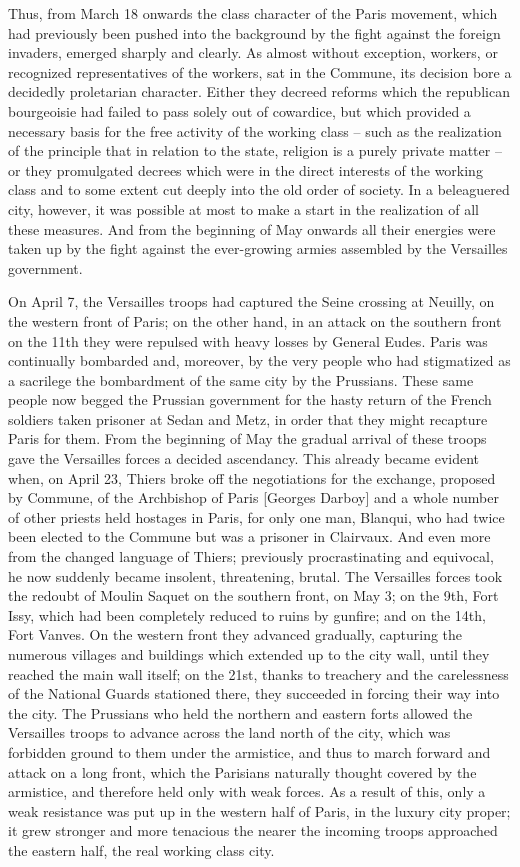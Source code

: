 \documentclass{book}
\begin{document}
Thus, from March 18 onwards the class character of the Paris movement,
which had previously been pushed into the background by the fight against
the foreign invaders, emerged sharply and clearly. As almost without
exception, workers, or recognized representatives of the workers, sat in
the Commune, its decision bore a decidedly proletarian character. Either
they decreed reforms which the republican bourgeoisie had failed to pass
solely out of cowardice, but which provided a necessary basis for the free
activity of the working class – such as the realization of the principle
that in relation to the state, religion is a purely private matter – or
they promulgated decrees which were in the direct interests of the working
class and to some extent cut deeply into the old order of society. In
a beleaguered city, however, it was possible at most to make a start in
the realization of all these measures. And from the beginning of May
onwards all their energies were taken up by the fight against the
ever-growing armies assembled by the Versailles government.

On April 7, the Versailles troops had captured the Seine crossing at
Neuilly, on the western front of Paris; on the other hand, in an attack on
the southern front on the 11th they were repulsed with heavy losses by
General Eudes. Paris was continually bombarded and, moreover, by the very
people who had stigmatized as a sacrilege the bombardment of the same city
by the Prussians. These same people now begged the Prussian government for
the hasty return of the French soldiers taken prisoner at Sedan and Metz,
in order that they might recapture Paris for them. From the beginning of
May the gradual arrival of these troops gave the Versailles forces
a decided ascendancy. This already became evident when, on April 23,
Thiers broke off the negotiations for the exchange, proposed by Commune,
of the Archbishop of Paris [Georges Darboy] and a whole number of other
priests held hostages in Paris, for only one man, Blanqui, who had twice
been elected to the Commune but was a prisoner in Clairvaux. And even more
from the changed language of Thiers; previously procrastinating and
equivocal, he now suddenly became insolent, threatening, brutal. The
Versailles forces took the redoubt of Moulin Saquet on the southern front,
on May 3; on the 9th, Fort Issy, which had been completely reduced to
ruins by gunfire; and on the 14th, Fort Vanves. On the western front they
advanced gradually, capturing the numerous villages and buildings which
extended up to the city wall, until they reached the main wall itself; on
the 21st, thanks to treachery and the carelessness of the National Guards
stationed there, they succeeded in forcing their way into the city. The
Prussians who held the northern and eastern forts allowed the Versailles
troops to advance across the land north of the city, which was forbidden
ground to them under the armistice, and thus to march forward and attack
on a long front, which the Parisians naturally thought covered by the
armistice, and therefore held only with weak forces. As a result of this,
only a weak resistance was put up in the western half of Paris, in the
luxury city proper; it grew stronger and more tenacious the nearer the
incoming troops approached the eastern half, the real working class city.
\end{document}
